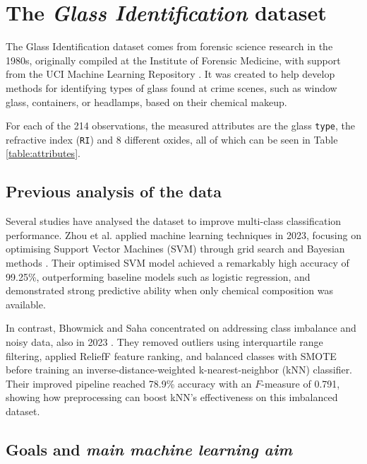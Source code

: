 \documentclass[dtu]{dtuarticle}
\begin{document}
	\tableofcontents

	\newpage

	\section{The \textit{Glass Identification} dataset}

	The Glass Identification dataset comes from forensic science research in the 1980s, originally compiled at the Institute of Forensic Medicine, with support from the UCI Machine Learning Repository \cite{dataset}. It was created to help develop methods for identifying types of glass found at crime scenes, such as window glass, containers, or headlamps, based on their chemical makeup.

	For each of the 214 observations, the measured attributes are the glass \texttt{type}, the refractive index (\texttt{RI}) and 8 different oxides, all of which can be seen in Table \ref{table:attributes}.


	\subsection{Previous analysis of the data}

	Several studies have analysed the dataset to improve multi-class classification performance. Zhou et al. applied machine learning techniques in 2023, focusing on optimising Support Vector Machines (SVM) through grid search and Bayesian methods \cite{zhou}. Their optimised SVM model achieved a remarkably high accuracy of 99.25\%, outperforming baseline models such as logistic regression, and demonstrated strong predictive ability when only chemical composition was available.

	In contrast, Bhowmick and Saha concentrated on addressing class imbalance and noisy data, also in 2023 \cite{bhowmick}. They removed outliers using interquartile range filtering, applied ReliefF feature ranking, and balanced classes with SMOTE before training an inverse-distance-weighted k-nearest-neighbor (kNN) classifier. Their improved pipeline reached 78.9\% accuracy with an $F$-measure of 0.791, showing how preprocessing can boost kNN’s effectiveness on this imbalanced dataset.

	\subsection{Goals and \textit{main machine learning aim}}
\end{document}
